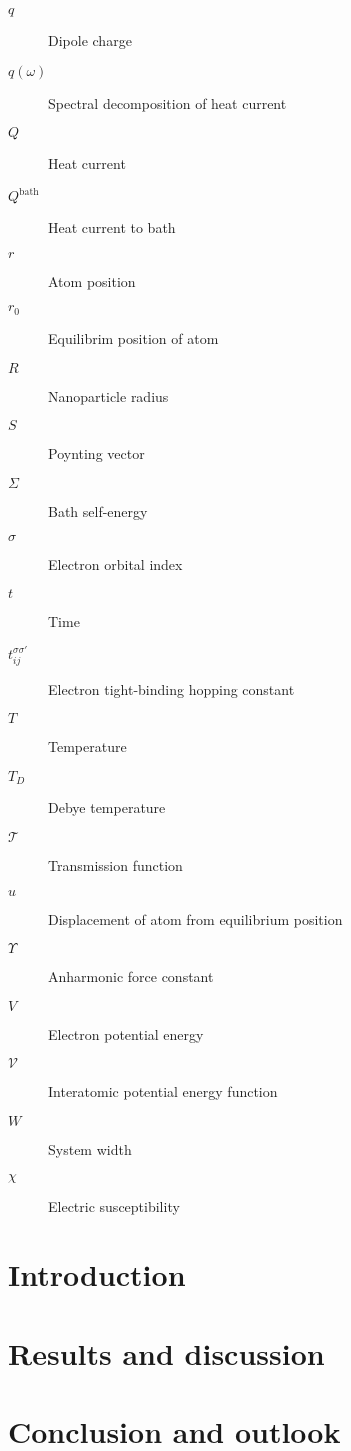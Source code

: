 \documentclass[dissertation,draft*]{aaltoseries}
\newcommand{\bb}{\mathbf}
\newcommand{\bu}{\bb{u}}
\begin{document}
\begin{description}
  \item[$q$] Dipole charge
  \item[$q(\omega)$] Spectral decomposition of heat current
  \item[$Q$] Heat current
  \item[$Q^{\textrm{bath}}$] Heat current to bath
  \item[$r$] Atom position
  \item[$r_0$] Equilibrim position of atom 
  \item[$R$] Nanoparticle radius
  \item[$S$] Poynting vector
  \item[$\Sigma$] Bath self-energy
  \item[$\sigma$] Electron orbital index
  \item[$t$] Time
  \item[$t_{ij}^{\sigma\sigma'}$] Electron tight-binding hopping constant
  \item[$T$] Temperature
  \item[$T_D$] Debye temperature
  \item[$\mathcal{T}$] Transmission function
  \item[$u$] Displacement of atom from equilibrium position
  \item[$\Upsilon$] Anharmonic force constant
  \item[${V}$] Electron potential energy
  \item[$\mathcal{V}$] Interatomic potential energy function
  \item[$W$] System width
  \item[$\chi$] Electric susceptibility
\end{description}

\chapter{Introduction}
\setcounter{page}{1}




\chapter{Results and discussion}




\chapter{Conclusion and outlook}
\end{document}
